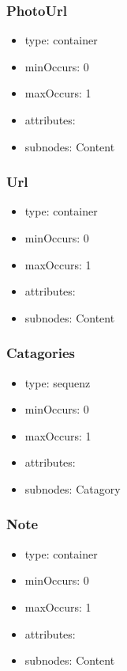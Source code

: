 \documentclass[a4paper,11pt]{article}
\begin{document}
\subsubsection{PhotoUrl}
\begin{itemize}
  \item type: container
  \item minOccurs: 0
  \item maxOccurs: 1
  \item attributes:
  \item subnodes:
  \subitem Content
\end{itemize}

\subsubsection{Url}
\begin{itemize}
  \item type: container
  \item minOccurs: 0
  \item maxOccurs: 1
  \item attributes:
  \item subnodes:
  \subitem Content
\end{itemize}

\subsubsection{Catagories}
\begin{itemize}
  \item type: sequenz
  \item minOccurs: 0
  \item maxOccurs: 1
  \item attributes:
  \item subnodes:
  \subitem Catagory
\end{itemize}

\subsubsection{Note}
\begin{itemize}
  \item type: container
  \item minOccurs: 0
  \item maxOccurs: 1
  \item attributes:
  \item subnodes:
  \subitem Content
\end{itemize}
\end{document}
